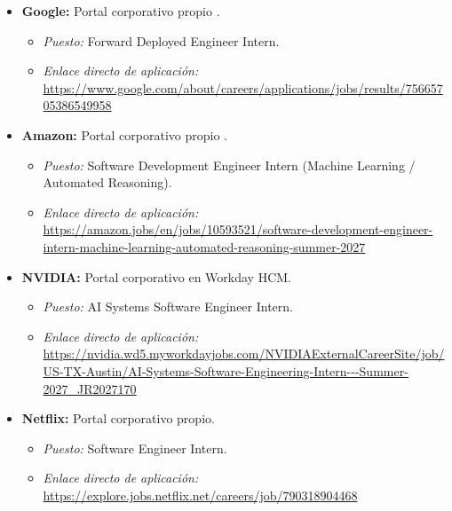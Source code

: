 \documentclass[12pt]{article}
\begin{document}
\begin{itemize}[leftmargin=0.2in, itemsep=0.3em]
    \item \textbf{Google:} Portal corporativo propio \parencite{google2026careers}.
    \begin{itemize}[leftmargin=0.15in, noitemsep]
        \item \textit{Puesto:} Forward Deployed Engineer Intern.
        \item \textit{Enlace directo de aplicación:}\\ {\small\url{https://www.google.com/about/careers/applications/jobs/results/75665705386549958}}
    \end{itemize}

    \item \textbf{Amazon:} Portal corporativo propio \parencite{amazon2026jobs}.
    \begin{itemize}[leftmargin=0.15in, noitemsep]
        \item \textit{Puesto:} Software Development Engineer Intern (Machine Learning / Automated Reasoning).
        \item \textit{Enlace directo de aplicación:}\\ {\small\url{https://amazon.jobs/en/jobs/10593521/software-development-engineer-intern-machine-learning-automated-reasoning-summer-2027}}
    \end{itemize}

    \item \textbf{NVIDIA:} Portal corporativo en Workday HCM.
    \begin{itemize}[leftmargin=0.15in, noitemsep]
        \item \textit{Puesto:} AI Systems Software Engineer Intern.
        \item \textit{Enlace directo de aplicación:}\\ {\small\url{https://nvidia.wd5.myworkdayjobs.com/NVIDIAExternalCareerSite/job/US-TX-Austin/AI-Systems-Software-Engineering-Intern---Summer-2027_JR2027170}}
    \end{itemize}

    \item \textbf{Netflix:} Portal corporativo propio.
    \begin{itemize}[leftmargin=0.15in, noitemsep]
        \item \textit{Puesto:} Software Engineer Intern.
        \item \textit{Enlace directo de aplicación:}\\ {\small\url{https://explore.jobs.netflix.net/careers/job/790318904468}}
    \end{itemize}


\end{itemize}
\end{document}
